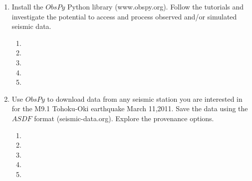 \begin{enumerate}
\begin{enumerate}
\item[]
\item[]
\item[] 
\item[]
\item[] 
\end{enumerate}
\item
Install the $ObsPy$ Python library (www.obspy.org). Follow the tutorials and investigate the potential to access and process observed and/or simulated seismic data. 
\begin{enumerate}
\item[]
\item[]
\item[] 
\item[]
\item[] 
\end{enumerate}
\item
Use $ObsPy$ to download data from any seismic station you are interested in for the M9.1 Tohoku-Oki earthquake March 11,2011. Save the data using the $ASDF$ format (seismic-data.org). Explore the provenance options.   
\begin{enumerate}
\item[]
\item[]
\item[] 
\item[]
\item[] 
\end{enumerate}
\end{enumerate}